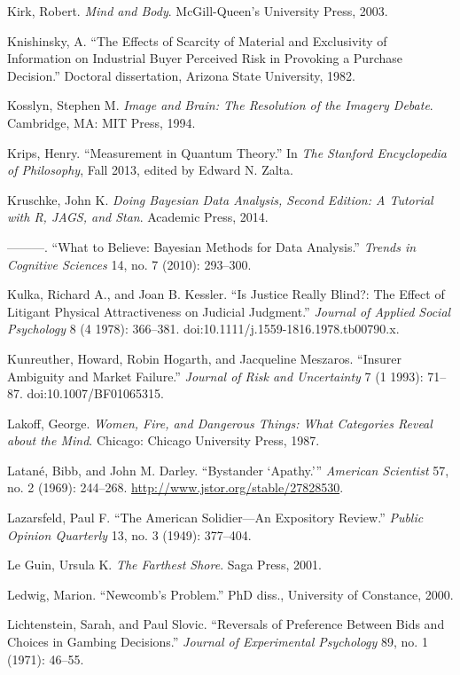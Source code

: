 {
 Kirk, Robert. \textit{Mind and Body}.
McGill-Queen's University Press, 2003.}

{
 Knishinsky, A. ``The Effects of Scarcity of
Material and Exclusivity of Information on Industrial Buyer Perceived
Risk in Provoking a Purchase Decision.'' Doctoral
dissertation, Arizona State University, 1982.}

{
 Kosslyn, Stephen M. \textit{Image and Brain: The Resolution of the
Imagery Debate}. Cambridge, MA: MIT Press, 1994.}

{
 Krips, Henry. ``Measurement in Quantum
Theory.'' In \textit{The Stanford Encyclopedia of
Philosophy}, Fall 2013, edited by Edward N. Zalta.}

{
 Kruschke, John K. \textit{Doing Bayesian Data Analysis, Second
Edition: A Tutorial with R, JAGS, and Stan}. Academic Press, 2014.}

{
 {}---{}---{}---. ``What to Believe: Bayesian
Methods for Data Analysis.'' \textit{Trends in
Cognitive Sciences} 14, no. 7 (2010): 293--300.}

{
 Kulka, Richard A., and Joan B. Kessler. ``Is
Justice Really Blind?: The Effect of Litigant Physical Attractiveness
on Judicial Judgment.'' \textit{Journal of Applied
Social Psychology} 8 (4 1978): 366--381.
doi:10.1111/j.1559-1816.1978.tb00790.x.}

{
 Kunreuther, Howard, Robin Hogarth, and Jacqueline Meszaros.
``Insurer Ambiguity and Market
Failure.'' \textit{Journal of Risk and Uncertainty} 7
(1 1993): 71--87. doi:10.1007/BF01065315.}

{
 Lakoff, George. \textit{Women, Fire, and Dangerous Things: What
Categories Reveal about the Mind}. Chicago: Chicago University Press,
1987.}

{
 Latané, Bibb, and John M. Darley. ``Bystander
`Apathy.'''
\textit{American Scientist} 57, no. 2 (1969): 244--268.
\url{http://www.jstor.org/stable/27828530}.}

{
 Lazarsfeld, Paul F. ``The American Solidier---An
Expository Review.'' \textit{Public Opinion
Quarterly} 13, no. 3 (1949): 377--404.}

{
 Le Guin, Ursula K. \textit{The Farthest Shore}. Saga Press, 2001.}

{
 Ledwig, Marion. ``Newcomb's
Problem.'' PhD diss., University of Constance, 2000.}

{
 Lichtenstein, Sarah, and Paul Slovic. ``Reversals
of Preference Between Bids and Choices in Gambing
Decisions.'' \textit{Journal of Experimental
Psychology} 89, no. 1 (1971): 46--55.}

